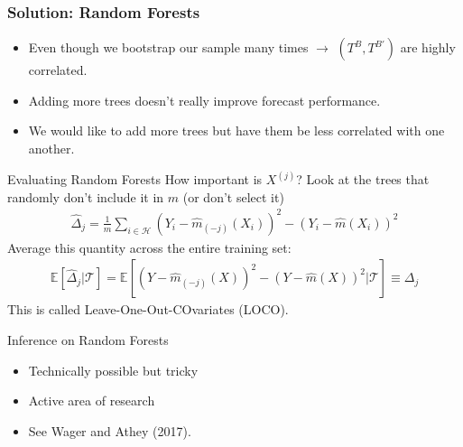 \documentclass[xcolor=pdftex,dvipsnames,table,mathserif,aspectratio=169]{beamer}
\begin{document}
\begin{frame}
\frametitle{Solution: Random Forests}
\begin{itemize}
\item Even though we bootstrap our sample many times $\rightarrow$ $(T^B,T^{B'})$ are highly correlated.
\item Adding more trees doesn't really improve forecast performance.
\item We would like to add more trees but have them be \alert{less correlated} with one another.
\end{itemize}
\end{frame}

\begin{frame}{Evaluating Random Forests}
How important is $X^{(j)}$? Look at the trees that randomly don't include it in $m$ (or don't select it)
\begin{align*}
\widehat{\Delta}_{j}=\frac{1}{m} \sum_{i \in \mathcal{H}} \left(Y_{i}-\widehat{m}_{(-j)}\left(X_{i}\right)\right)^{2}-\left(Y_{i}-\widehat{m}\left(X_{i}\right)\right)^{2}
\end{align*}
Average this quantity across the entire training set:
\begin{align*}
\mathbb{E}\left[\widehat{\Delta}_{j} | \mathcal{T}\right]=\mathbb{E}\left[\left(Y-\widehat{m}_{(-j)}(X)\right)^{2}-(Y-\widehat{m}(X))^{2} | \mathcal{T}\right] \equiv \Delta_{j}
\end{align*}
This is called \alert{Leave-One-Out-COvariates} (LOCO).
\end{frame}


\begin{frame}{Inference on Random Forests}
\begin{itemize}
\item Technically possible but tricky
\item Active area of research
\item See Wager and Athey (2017).
\end{itemize}
\end{frame}
\end{document}
